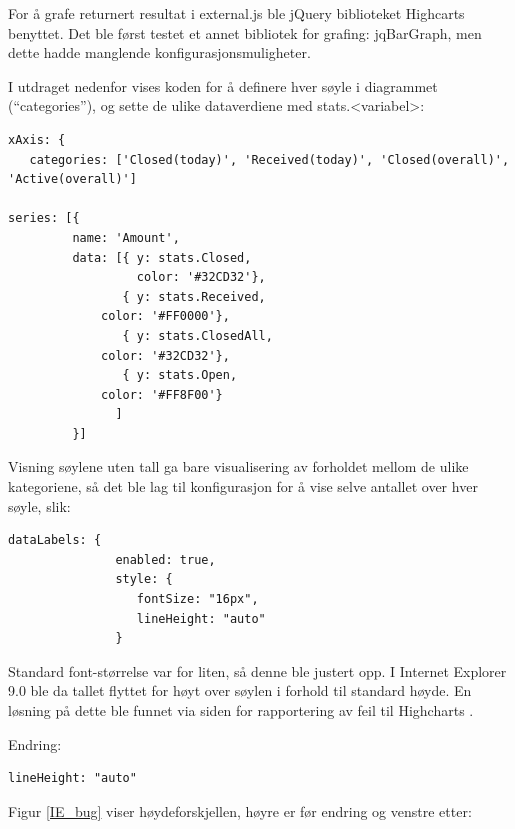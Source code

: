 For å grafe returnert resultat i external.js ble jQuery biblioteket Highcarts benyttet. Det ble først testet et annet bibliotek for grafing: jqBarGraph, men dette hadde manglende konfigurasjonsmuligheter.  

I utdraget nedenfor vises koden for å definere hver søyle i diagrammet (“categories”), og sette de ulike dataverdiene med stats.<variabel>:
\begin{lstlisting}
xAxis: {
   categories: ['Closed(today)', 'Received(today)', 'Closed(overall)', 'Active(overall)']

series: [{
         name: 'Amount',
         data: [{ y: stats.Closed,
                  color: '#32CD32'},
                { y: stats.Received,
             color: '#FF0000'},
                { y: stats.ClosedAll,
             color: '#32CD32'},
                { y: stats.Open,
             color: '#FF8F00'}
               ]
         }]
\end{lstlisting}

Visning søylene uten tall ga bare visualisering av forholdet mellom de ulike kategoriene, så det ble lag til konfigurasjon for å vise selve antallet over hver søyle, slik: 

\begin{lstlisting}
dataLabels: {
               enabled: true,
               style: {
                  fontSize: "16px",
                  lineHeight: "auto"
               }
\end{lstlisting}

Standard font-størrelse var for liten, så denne ble justert opp. I Internet Explorer 9.0 ble da tallet flyttet for høyt over søylen i forhold til standard høyde. En løsning på dette ble funnet via siden for rapportering av feil til Highcharts \cite{iebug}. 

Endring:

\begin{lstlisting}
lineHeight: "auto"
\end{lstlisting}

Figur \ref{IE_bug} viser høydeforskjellen, høyre er før endring og venstre etter:

